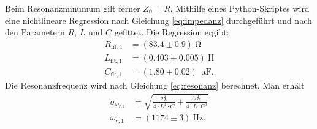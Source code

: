 \documentclass[12pt,a4paper,titlepage,headinclude]{scrartcl}
\numberwithin{equation}{subsection}
\newcommand{\mrm}[1]{\mathrm{#1}}
\begin{document}
Beim Resonanzminumum gilt ferner $Z_0=R$. Mithilfe eines Python-Skriptes wird eine nichtlineare Regression nach Gleichung \eqref{eq:impedanz} durchgeführt und nach den Parametern $R$, $L$ und $C$ gefittet. Die Regression ergibt:
\begin{align}
	R_{\mrm{fit},1}&=(83.4\pm0.9)~\mrm{\Omega}
	\label{eq:Rfit1}\\
	L_{\mrm{fit},1}&=(0.403\pm0.005)~\mrm{H}
	\label{eq:Lfit1}\\
	C_{\mrm{fit},1}&=(1.80\pm0.02)~\SI{}{\micro\farad}.
	\label{eq:Cfit1}
\end{align}
Die Resonanzfrequenz wird nach Gleichung \eqref{eq:resonanz} berechnet. Man erhält
\begin{align}
	\sigma_{\omega_{r,1}}&=\sqrt{\frac{\sigma_L^2}{4\cdot L^3\cdot C}+\frac{\sigma_C^2}{4\cdot L\cdot C^3}}
	\label{eq:sigmaresonanzfrequenz1}\\
	\omega_{r,1}&=(1174 \pm 3)~\mrm{Hz}.\label{eq:resonanzfrequenz1}
\end{align}
\end{document}
